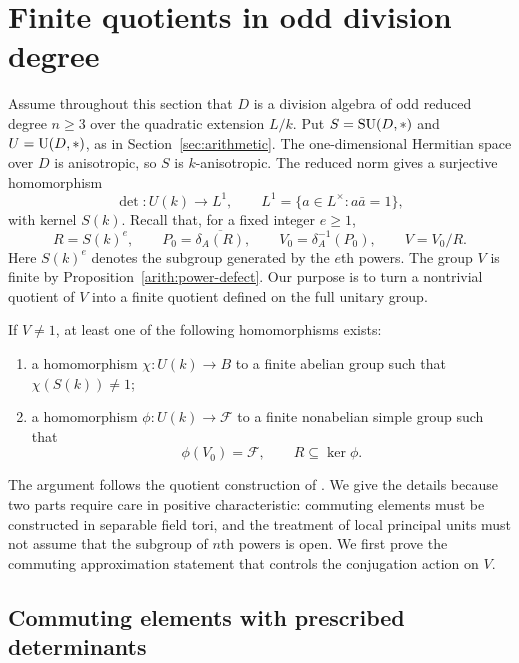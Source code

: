 \section{Finite quotients in odd division degree}\label{sec:quotients}

Assume throughout this section that $D$ is a division algebra of odd
reduced degree $n\geq3$ over the quadratic extension $L/k$.  Put
$S=\operatorname{SU}(D,*)$ and $U=\operatorname{U}(D,*)$, as in Section~\ref{sec:arithmetic}.
The one-dimensional Hermitian space over $D$ is anisotropic, so $S$
is $k$-anisotropic.  The reduced norm gives a surjective homomorphism
\[
 \det:U(k)\longrightarrow L^1,
 \qquad L^1=\{a\in L^\times:a\bar a=1\},
\]
with kernel $S(k)$.  Recall that, for a fixed integer $e\geq1$,
\[
 R=S(k)^e,\qquad
 P_0=\overline{\delta_A(R)},\qquad
 V_0=\delta_A^{-1}(P_0),\qquad V=V_0/R.
\]
Here $S(k)^e$ denotes the subgroup generated by the $e$th powers.
The group $V$ is finite by Proposition~\ref{arith:power-defect}.
Our purpose is to turn a nontrivial quotient of $V$ into a finite
quotient defined on the full unitary group.

\begin{proposition}\label{quo:dichotomy}
If $V\ne1$, at least one of the following homomorphisms exists:
\begin{enumerate}
 \item a homomorphism $\chi:U(k)\to B$ to a finite abelian group such
 that $\chi(S(k))\ne1$;
 \item a homomorphism $\phi:U(k)\to\mathcal F$ to a finite nonabelian
 simple group such that
 \[
   \phi(V_0)=\mathcal F,\qquad R\subseteq\ker\phi.
 \]
\end{enumerate}
\end{proposition}

The argument follows the quotient construction of
\cite[Section~3, especially Propositions~3.1 and~3.2]{MPNF}.
We give the details because two parts require care in positive
characteristic: commuting elements must be constructed in separable
field tori, and the treatment of local principal units must not assume
that the subgroup of $n$th powers is open.  We first prove the commuting
approximation statement that controls the conjugation action on $V$.

\subsection{Commuting elements with prescribed determinants}

